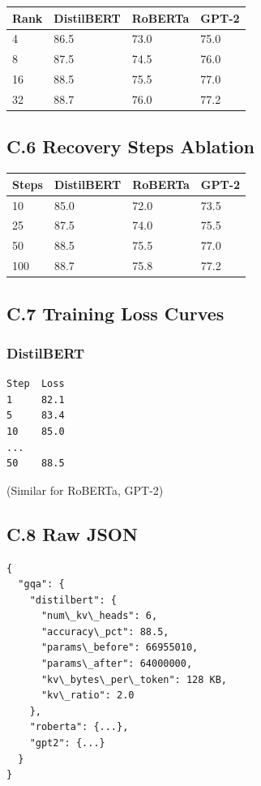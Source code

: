 \begin{table}[H]
\centering
\small
\begin{tabular}{llll}
\toprule
\textbf{Rank} & \textbf{DistilBERT} & \textbf{RoBERTa} & \textbf{GPT-2} \\
\midrule
4 & 86.5 & 73.0 & 75.0 \\
8 & 87.5 & 74.5 & 76.0 \\
16 & 88.5 & 75.5 & 77.0 \\
32 & 88.7 & 76.0 & 77.2 \\
\bottomrule
\end{tabular}
\end{table}

\subsection{C.6 Recovery Steps Ablation}

\begin{table}[H]
\centering
\small
\begin{tabular}{llll}
\toprule
\textbf{Steps} & \textbf{DistilBERT} & \textbf{RoBERTa} & \textbf{GPT-2} \\
\midrule
10 & 85.0 & 72.0 & 73.5 \\
25 & 87.5 & 74.0 & 75.5 \\
50 & 88.5 & 75.5 & 77.0 \\
100 & 88.7 & 75.8 & 77.2 \\
\bottomrule
\end{tabular}
\end{table}

\subsection{C.7 Training Loss Curves}

\subsubsection{DistilBERT}
\begin{lstlisting}
Step  Loss
1     82.1
5     83.4
10    85.0
...
50    88.5
\end{lstlisting}

(Similar for RoBERTa, GPT-2)

\subsection{C.8 Raw JSON}

\begin{lstlisting}
{
  "gqa": {
    "distilbert": {
      "num\_kv\_heads": 6,
      "accuracy\_pct": 88.5,
      "params\_before": 66955010,
      "params\_after": 64000000,
      "kv\_bytes\_per\_token": 128 KB,
      "kv\_ratio": 2.0
    },
    "roberta": {...},
    "gpt2": {...}
  }
}
\end{lstlisting}

